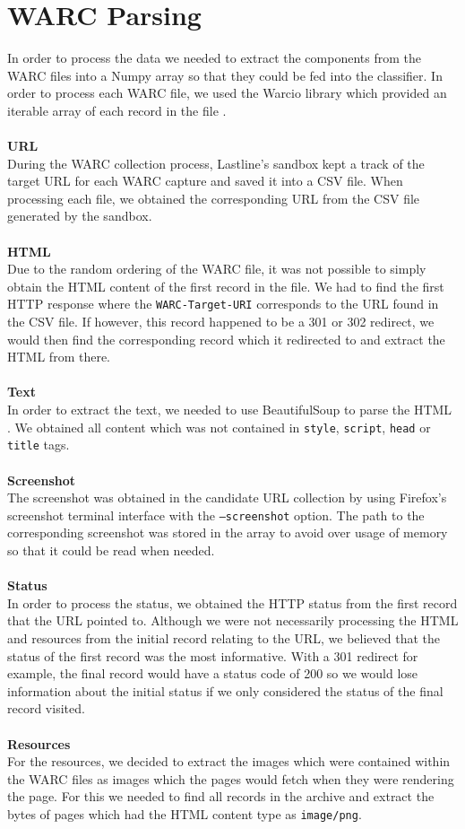 \documentclass[12pt,twoside]{report}
\begin{document}
\section{WARC Parsing}
In order to process the data we needed to extract the components from the WARC files into a Numpy array so that they could be fed into the classifier. In order to process each WARC file, we used the Warcio library which provided an iterable array of each record in the file \cite{warcio}.
\\\\
\textbf{URL}\\
During the WARC collection process, Lastline's sandbox kept a track of the target URL for each WARC capture and saved it into a CSV file. When processing each file, we obtained the corresponding URL from the CSV file generated by the sandbox.
\\\\
\textbf{HTML}\\
Due to the random ordering of the WARC file, it was not possible to simply obtain the HTML content of the first record in the file. We had to find the first HTTP response where the \texttt{WARC-Target-URI} corresponds to the URL found in the CSV file. If however, this record happened to be a 301 or 302 redirect, we would then find the corresponding record which it redirected to and extract the HTML from there. 
\\\\
\textbf{Text}\\
In order to extract the text, we needed to use BeautifulSoup to parse the HTML \cite{beautifulsoup}. We obtained all content which was not contained in \texttt{style}, \texttt{script}, \texttt{head} or \texttt{title} tags.
\\\\
\textbf{Screenshot}\\
The screenshot was obtained in the candidate URL collection by using Firefox's screenshot terminal interface with the \texttt{--screenshot} option. The path to the corresponding screenshot was stored in the array to avoid over usage of memory so that it could be read when needed.
\\\\
\textbf{Status}\\
In order to process the status, we obtained the HTTP status from the first record that the URL pointed to. Although we were not necessarily processing the HTML and resources from the initial record relating to the URL, we believed that the status of the first record was the most informative. With a 301 redirect for example, the final record would have a status code of 200 so we would lose information about the initial status if we only considered the status of the final record visited.\\\\
\textbf{Resources}\\
For the resources, we decided to extract the images which were contained within the WARC files as images which the pages would fetch when they were rendering the page. For this we needed to find all records in the archive and extract the bytes of pages which had the HTML content type as \texttt{image/png}.
\end{document}
